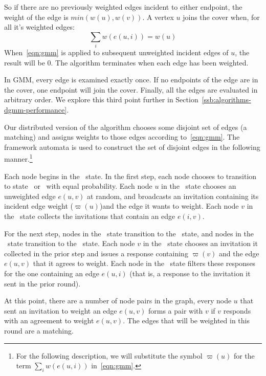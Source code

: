 \documentclass[conference, 10pt, letter]{IEEEtran}
\begin{document}


So if there are no previously weighted edges incident to either endpoint, the weight of the edge is $min(w(u),w(v))$. A vertex $u$ joins the cover when, for all it's weighted edges: \begin{equation}\sum_i w(e(u,i)) = w(u) \label{eqn:sat} \end{equation} When~\eqref{eqn:gmm} is applied to subsequent unweighted incident edges of $u$, the result will be 0. The algorithm terminates when each edge has been weighted. 

In GMM, every edge is examined exactly once. If no endpoints of the edge are in the cover, one endpoint will join the cover. Finally, all the edges are evaluated in arbitrary order. We explore this third point further in Section~\ref{ssb:algorithms-dgmm-performance}. 

Our distributed version of the algorithm chooses some disjoint set of edges (a matching) and assigns weights to those edges according to~\eqref{eqn:gmm}. The framework automata is used to construct the set of disjoint edges in the following manner.\footnote{For the following description, we will substitute the symbol $\varpi(u)$ for the term $\sum_i w(e(u,i))$ in~\eqref{eqn:gmm}.\label{fn:varpi}}

Each node begins in the \cCd\ state. In the first step, each node chooses to transition to state \cId\ or \cLd\ with equal probability. Each node $u$ in the \cId\ state chooses an unweighted edge $e(u,v)$ at random, and broadcasts an invitation containing its incident edge weight ($\varpi(u)$)\footnotemark[\value{footnote}] and the edge it wants to weight. Each node $v$ in the \cLd\ state collects the invitations that contain an edge $e(i,v)$.

For the next step, nodes in the \cLd\ state transition to the \cRd\ state, and nodes in the \cId\ state transition to the \cWd\ state. Each node $v$ in the \cLd\ state chooses an invitation it collected in the prior step and issues a response containing $\varpi(v)$ and the edge $e(u,v)$ that it agrees to weight. Each node in the \cWd\ state filters these responses for the one containing an edge $e(u,i)$ (that is, a response to the invitation it sent in the prior round). 

At this point, there are a number of node pairs in the graph, every node $u$ that sent an invitation to weight an edge $e(u,v)$ forms a pair with $v$ if $v$ responds with an agreement to weight $e(u,v)$. The edges that will be weighted in this round are a matching.
\end{document}
